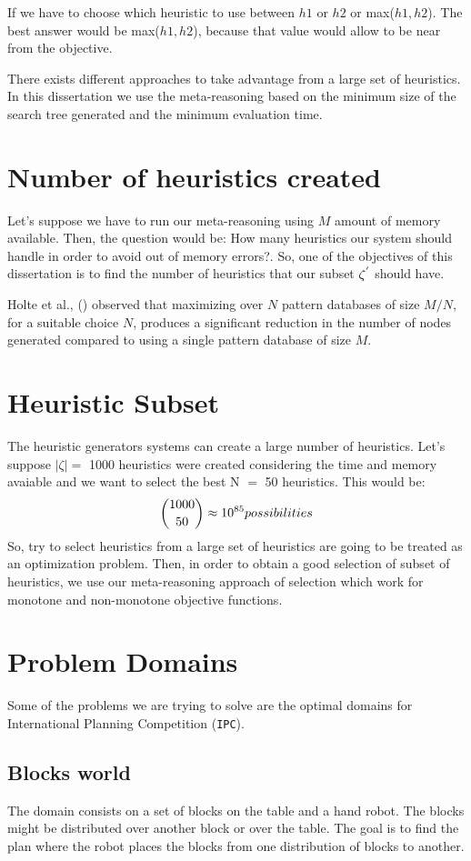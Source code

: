 If we have to choose which heuristic to use between $h1$ or $h2$ or max($h1, h2$). The best answer would be max($h1, h2$), because that value would allow to be near from the objective.

There exists different approaches to take advantage from a large set of heuristics. In this dissertation we use the meta-reasoning based on the minimum size of the search tree generated and the minimum evaluation time.

\section{Number of heuristics created}
Let's suppose we have to run our meta-reasoning using $M$ amount of memory available. Then, the question would be: How many heuristics our system should handle in order to avoid out of memory errors?. So, one of the objectives of this dissertation is to find the number of heuristics that our subset $\zeta\sp{'}$ should have.
 
Holte et al., (\citeyear{holte2006maximizing}) observed that maximizing over $N$ pattern databases of size $M/N$, for a suitable choice $N$, produces a significant reduction in the number of nodes generated compared to using a single pattern database of size $M$.

\section{Heuristic Subset}
The heuristic generators systems can create a large number of heuristics. Let's suppose $|\zeta| = $ 1000 heuristics were created considering the time and memory avaiable and we want to select the best N $=$ 50 heuristics. This would be: $${1000\choose 50} \approx 10\sp{85} possibilities$$
So, try to select heuristics from a large set of heuristics are going to be treated as an optimization problem. Then, in order to obtain a good selection of subset of heuristics, we use our meta-reasoning approach of selection which work for monotone and non-monotone objective functions.

\section{Problem Domains}
Some of the problems we are trying to solve are the optimal domains for International Planning Competition (\texttt{IPC}).

\subsection{Blocks world}
The domain consists on a set of blocks on the table and a hand robot. The blocks might be distributed over another block or over the table. The goal is to find the plan where the robot places the blocks from one distribution of blocks to another.

